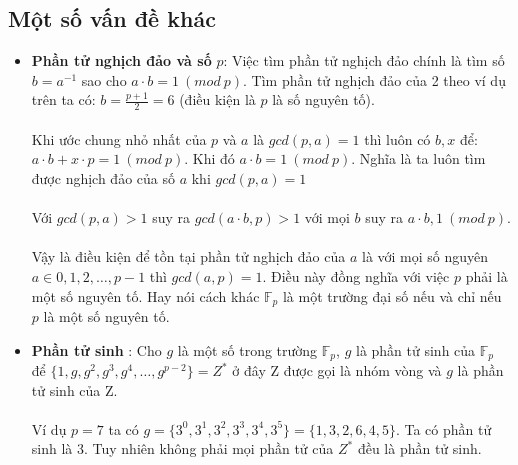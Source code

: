 \documentclass[a4paper,12pt]{report}
\begin{document}
\subsection*{Một số vấn đề khác}
\begin{itemize}
\item \textbf{Phần tử nghịch đảo  và số} $p$: Việc tìm phần tử nghịch đảo chính là tìm số $b = a^{-1}$ sao cho $a \cdot b = 1 \ (mod \ p)$. Tìm phần tử nghịch đảo của 2 theo ví dụ trên ta có: $\displaystyle b = \frac{p+1}{2} = 6$ (điều kiện là $p$ là số nguyên tố). \\ \\
Khi ước chung nhỏ nhất của $p$ và $a$ là $gcd(p, a) = 1$ thì luôn có $b, x$ để: $a \cdot b + x \cdot p = 1 \ (mod \ p)$. Khi đó $a \cdot b = 1 \ (mod \ p)$. Nghĩa là ta luôn tìm được nghịch đảo của số $a$ khi $gcd(p, a) = 1$ \\ \\
Với $gcd(p, a) > 1$ suy ra $gcd(a \cdot b, p) > 1$ với mọi $b$ suy ra $a \cdot b , 1 \ (mod \ p)$. \\ \\
Vậy là điều kiện để tồn tại phần tử nghịch đảo của $a$ là với mọi số nguyên $a \in {0, 1, 2, \ldots , p-1}$ thì $gcd(a, p) = 1$. Điều này đồng nghĩa với việc $p$ phải là một số nguyên tố. Hay nói cách khác $\mathbb{F}_p$ là một trường đại số nếu và chỉ nếu $p$ là một số nguyên tố.
\item \textbf{Phần tử sinh }: Cho $g$ là một số trong trường $\mathbb{F}_p$, $g$ là phần tử sinh của $\mathbb{F}_p$ để $\{1, g, g^2, g^3, g^4, \ldots, g^{p-2}\} = Z^*$ ở đây Z được gọi là nhóm vòng  và $g$ là phần tử sinh của Z. \\ \\
Ví dụ $p = 7$ ta có $g = \{ 3^0, 3^1, 3^2, 3^3, 3^4, 3^5 \} = \{1, 3, 2, 6, 4, 5\}$. Ta có phần tử sinh là 3. Tuy nhiên không phải mọi phần tử của $Z^*$ đều là phần tử sinh.
\end{itemize}
\end{document}
